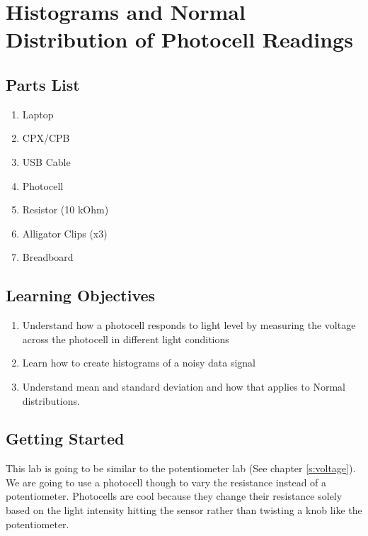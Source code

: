\newpage

\section{Histograms and Normal Distribution of Photocell Readings}
\label{s:photocell}

\subsection{Parts List}

\begin{enumerate}[itemsep=-5pt]
\item Laptop
\item CPX/CPB
\item USB Cable
\item Photocell
\item Resistor (10 kOhm)
\item Alligator Clips (x3)
\item Breadboard
\end{enumerate}

\subsection{Learning Objectives}
\begin{enumerate}[itemsep=-5pt]
\item Understand how a photocell responds to light level by measuring the voltage across the photocell in different light conditions
\item Learn how to create histograms of a noisy data signal
\item Understand mean and standard deviation and how that applies to Normal distributions.
\end{enumerate}

\subsection{Getting Started}

This lab is going to be similar to the potentiometer lab (See chapter \ref{s:voltage}). We are going to use a photocell though to vary the resistance instead of a potentiometer. Photocells are cool because they change their resistance solely based on the light intensity hitting the sensor rather than twisting a knob like the potentiometer.

